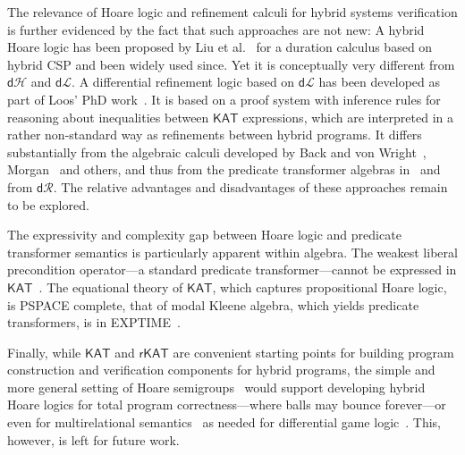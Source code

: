 \documentclass[envcountsame,envcountsect]{llncs}
\newcommand{\KAT}{\mathsf{KAT}}
\newcommand{\rKAT}{\mathsf{rKAT}}
\newcommand{\dL}{\mathsf{d}\mathcal{L}}
\newcommand{\dH}{\mathsf{d}\mathcal{H}}
\newcommand{\dR}{\mathsf{d}\mathcal{R}}
\begin{document}
The relevance of Hoare logic and refinement calculi for hybrid systems
verification is further evidenced by the fact that such approaches are
not new: A hybrid Hoare logic has been proposed by Liu et
al.~\cite{LiuLQZZZZ10} for a duration calculus based on hybrid CSP and
been widely used since. Yet it is conceptually very different from
$\dH$ and $\dL$. A differential refinement logic based on $\dL$ has
been developed as part of Loos' PhD work~\cite{LoosP16}.  It is based
on a proof system with inference rules for reasoning about
inequalities between $\KAT$ expressions, which are interpreted in a
rather non-standard way as refinements between hybrid programs. It
differs substantially from the algebraic calculi developed by Back and
von Wright~\cite{BackW98}, Morgan~\cite{Morgan94} and others, and thus
from the predicate transformer algebras in~\cite{MuniveS19} and from
$\dR$.  The relative advantages and disadvantages of these approaches
remain to be explored.

The expressivity and complexity gap between Hoare logic and predicate
transformer semantics is particularly apparent within algebra. The
weakest liberal precondition operator---a standard predicate
transformer---cannot be expressed in $\KAT$~\cite{Struth18}.  The
equational theory of $\KAT$, which captures propositional Hoare logic,
is PSPACE complete, that of modal Kleene algebra, which yields
predicate transformers, is in EXPTIME~\cite{MollerS06}.  

Finally, while $\KAT$ and $\rKAT$ are convenient starting points for
building program construction and verification components for hybrid
programs, the simple and more general setting of Hoare
semigroups~\cite{Struth18} would support developing hybrid Hoare
logics for total program correctness---where balls may bounce
forever---or even for multirelational
semantics~\cite{FurusawaS16,FurusawaS15} as needed for differential
game logic~\cite{Platzer15}. This, however, is left for future work.










\end{document}
